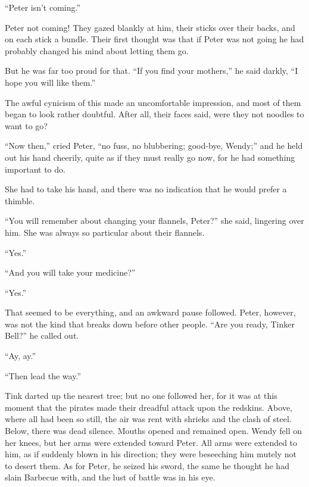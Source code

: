 “Peter isn’t coming.”

Peter not coming!
They gazed blankly at him, their sticks over their backs, and on each stick a bundle.
Their first thought was that if Peter was not going he had probably changed his mind about letting them go.

But he was far too proud for that.
“If you find your mothers,” he said darkly, “I hope you will like them.”

The awful cynicism of this made an uncomfortable impression,
and most of them began to look rather doubtful.
After all, their faces said, were they not noodles to want to go?

“Now then,” cried Peter, “no fuss, no blubbering;
good-bye, Wendy;”
and he held out his hand cheerily,
quite as if they must really go now, for he had something important to do.

She had to take his hand, and there was no indication that he would prefer a thimble.

“You will remember about changing your flannels, Peter?\@” she said, lingering over him.
She was always so particular about their flannels.

“Yes.”

“And you will take your medicine?”

“Yes.”

That seemed to be everything, and an awkward pause followed.
Peter, however, was not the kind that breaks down before other people.
“Are you ready, Tinker Bell?\@” he called out.

“Ay, ay.”

“Then lead the way.”

Tink darted up the nearest tree;
but no one followed her, for it was at this moment that the pirates made their dreadful attack upon the redskins.
Above, where all had been so still, the air was rent with shrieks and the clash of steel.
Below, there was dead silence.
Mouths opened and remained open.
Wendy fell on her knees, but her arms were extended toward Peter.
All arms were extended to him, as if suddenly blown in his direction;
they were beseeching him mutely not to desert them.
As for Peter, he seized his sword, the same he thought he had slain Barbecue with,
and the lust of battle was in his eye.

\endinput
